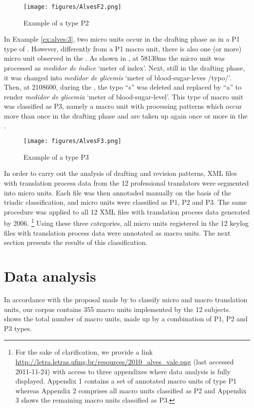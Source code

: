 \documentclass[output=paper]{LSP/langsci}
\begin{document}
\begin{figure}
\texttt{[image: figures/AlvesF2.png]}
\caption{Example of a  type P2}
\label{fig:alves:2}
\end{figure} 
  
In Example \ref{ex:alves:3}, two micro units occur in the drafting phase as in a P1 type of . However, differently from a P1 macro unit, there is also one (or more) micro unit observed in the . As shown in , at 58130ms the micro unit was processed as \textit{medidor de índice} `meter of index'. Next, still in the drafting phase, it was changed into \textit{medidor de glicemis} `meter of blood-sugar-leves /typo/'. Then, at 2108600, during the , the typo ``s'' was deleted and replaced by ``a'' to render \textit{medidor de glicemia} `meter of blood-sugar-level'. This type of macro unit was classified as P3, namely a macro unit with processing patterns which occur more than once in the drafting phase and are taken up again once or more in the .

\begin{figure}
\texttt{[image: figures/AlvesF3.png]}
\caption{Example of a  type P3 }
\label{fig:alves:3}
\end{figure} 

In order to carry out the analysis of drafting and revision patterns, XML files with translation process data from the 12 professional translators were segmented into micro units. Each file was then annotaded manually on the basis of the triadic classification, and micro units were classified as P1, P2 and P3. The same procedure was applied to all 12 XML files with translation process data generated by  2006. \footnote{For the sake of clarification, we provide a link \url{http://letra.letras.ufmg.br/resources/2010_alves_vale.png} (last accessed 2011-11-24) with access to three appendixes where data analysis is fully displayed. Appendix 1 contains a set of annotated macro units of type P1 whereas Appendix 2 comprises all macro units classified as P2 and Appendix 3 shows the remaining macro units classified as P3.} Using these three categories, all micro units registered in the 12 keylog files with translation process data were annotated as macro units. The next section presents the results of this classification.

\section{Data analysis}\label{sec:alves:4}
In accordance with the proposal made by  \citet{AlvesVale2009} to classify micro and macro translation units, our corpus contains 355 macro units implemented by the 12 subjects.  shows the total number of macro units, made up by a combination of P1, P2 and P3 types.
\end{document}
